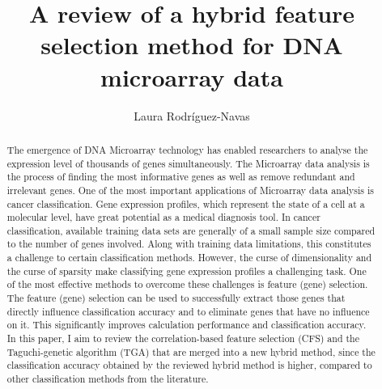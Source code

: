 \documentclass[runningheads]{llncs}
\begin{document}
%
\title{A review of a hybrid feature selection method for DNA microarray data}
%
%
\author{Laura Rodríguez-Navas}
%
%
%
\maketitle              %
%
\begin{abstract}
The emergence of DNA Microarray technology has enabled researchers to analyse the expression level of thousands of genes simultaneously. The Microarray data analysis is the process of finding the most informative genes as well as remove redundant and irrelevant genes. One of the most important applications of Microarray data analysis is cancer classification. Gene expression profiles, which represent the state of a cell at a molecular level, have great potential as a medical diagnosis tool. In cancer classification, available training data sets are generally of a small sample size compared to the number of genes involved. Along with training data limitations, this constitutes a challenge to certain classification methods. However, the curse of dimensionality and the curse of sparsity make classifying gene expression profiles a challenging task. One of the most effective methods to overcome these challenges is feature (gene) selection. The feature (gene) selection can be used to successfully extract those genes that directly influence classification accuracy and to eliminate genes that have no influence on it. This significantly improves calculation performance and classification accuracy. In this paper, I aim to review the correlation-based feature selection (CFS) and the Taguchi-genetic algorithm (TGA) that are merged into a new hybrid method, since the classification accuracy obtained by the reviewed hybrid method is higher, compared to other classification methods from the literature.


\end{abstract}
%
%
%
\end{document}
